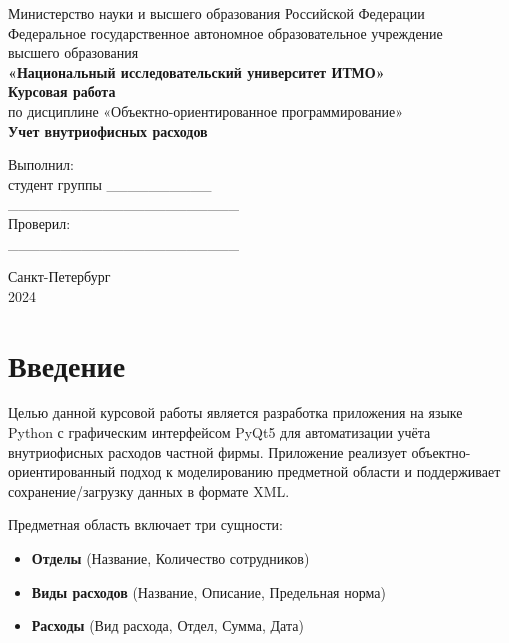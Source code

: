 \documentclass[14pt,a4paper]{extreport}
\begin{document}
\begin{titlepage}
\begin{center}
\large
Министерство науки и высшего образования Российской Федерации\\[5pt]
Федеральное государственное автономное образовательное учреждение\\
высшего образования\\[5pt]
\textbf{«Национальный исследовательский университет ИТМО»}\\[20pt]
\Large
\textbf{Курсовая работа}\\[5pt]
по дисциплине «Объектно-ориентированное программирование»\\[20pt]
\LARGE
\textbf{Учет внутриофисных расходов}\\[40pt]
\end{center}

\begin{flushright}
Выполнил:\\
студент группы \_\_\_\_\_\_\_\_\_\_\\
\_\_\_\_\_\_\_\_\_\_\_\_\_\_\_\_\_\_\_\_\_\_\\
Проверил:\\
\_\_\_\_\_\_\_\_\_\_\_\_\_\_\_\_\_\_\_\_\_\_\\
\end{flushright}

\vfill
\begin{center}
Санкт-Петербург\\
2024
\end{center}
\end{titlepage}

\tableofcontents
\newpage

\chapter{Введение}

Целью данной курсовой работы является разработка приложения на языке Python с графическим интерфейсом PyQt5 для автоматизации учёта внутриофисных расходов частной фирмы. Приложение реализует объектно-ориентированный подход к моделированию предметной области и поддерживает сохранение/загрузку данных в формате XML.

Предметная область включает три сущности:
\begin{itemize}
    \item \textbf{Отделы} (Название, Количество сотрудников)
    \item \textbf{Виды расходов} (Название, Описание, Предельная норма)
    \item \textbf{Расходы} (Вид расхода, Отдел, Сумма, Дата)
\end{itemize}
\end{document}
